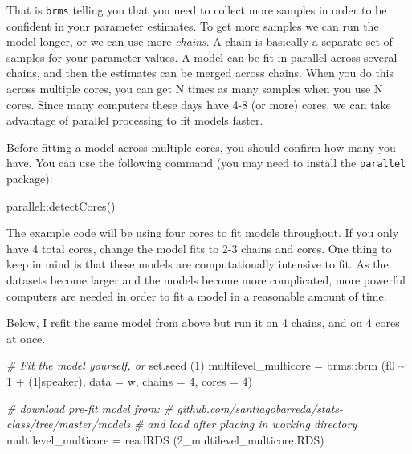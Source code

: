 \documentclass[
]{book}
\newenvironment{Shaded}{\begin{snugshade}}{\end{snugshade}}
\newcommand{\AttributeTok}[1]{\textcolor[rgb]{0.77,0.63,0.00}{#1}}
\newcommand{\CommentTok}[1]{\textcolor[rgb]{0.56,0.35,0.01}{\textit{#1}}}
\newcommand{\DecValTok}[1]{\textcolor[rgb]{0.00,0.00,0.81}{#1}}
\newcommand{\FunctionTok}[1]{\textcolor[rgb]{0.00,0.00,0.00}{#1}}
\newcommand{\NormalTok}[1]{#1}
\newcommand{\OtherTok}[1]{\textcolor[rgb]{0.56,0.35,0.01}{#1}}
\newcommand{\SpecialCharTok}[1]{\textcolor[rgb]{0.00,0.00,0.00}{#1}}
\newcommand{\StringTok}[1]{\textcolor[rgb]{0.31,0.60,0.02}{#1}}
\begin{document}
That is \texttt{brms} telling you that you need to collect more samples in order to be confident in your parameter estimates. To get more samples we can run the model longer, or we can use more \emph{chains}. A chain is basically a separate set of samples for your parameter values. A model can be fit in parallel across several chains, and then the estimates can be merged across chains. When you do this across multiple cores, you can get N times as many samples when you use N cores. Since many computers these days have 4-8 (or more) cores, we can take advantage of parallel processing to fit models faster.

Before fitting a model across multiple cores, you should confirm how many you have. You can use the following command (you may need to install the \texttt{parallel} package):

\begin{Shaded}
\begin{Highlighting}[]
\NormalTok{parallel}\SpecialCharTok{::}\FunctionTok{detectCores}\NormalTok{()}
\end{Highlighting}
\end{Shaded}

The example code will be using four cores to fit models throughout. If you only have 4 total cores, change the model fits to 2-3 chains and cores. One thing to keep in mind is that these models are computationally intensive to fit. As the datasets become larger and the models become more complicated, more powerful computers are needed in order to fit a model in a reasonable amount of time.

Below, I refit the same model from above but run it on 4 chains, and on 4 cores at once.

\begin{Shaded}
\begin{Highlighting}[]
\CommentTok{\# Fit the model yourself, or}
\FunctionTok{set.seed}\NormalTok{ (}\DecValTok{1}\NormalTok{)}
\NormalTok{multilevel\_multicore }\OtherTok{=}  
\NormalTok{  brms}\SpecialCharTok{::}\FunctionTok{brm}\NormalTok{ (f0 }\SpecialCharTok{\textasciitilde{}} \DecValTok{1} \SpecialCharTok{+}\NormalTok{ (}\DecValTok{1}\SpecialCharTok{|}\NormalTok{speaker), }\AttributeTok{data =}\NormalTok{ w, }\AttributeTok{chains =} \DecValTok{4}\NormalTok{, }\AttributeTok{cores =} \DecValTok{4}\NormalTok{)}

\CommentTok{\# download pre{-}fit model from: }
\CommentTok{\# github.com/santiagobarreda/stats{-}class/tree/master/models}
\CommentTok{\# and load after placing in working directory}
\NormalTok{multilevel\_multicore }\OtherTok{=} \FunctionTok{readRDS}\NormalTok{ (}\StringTok{\textquotesingle{}2\_multilevel\_multicore.RDS\textquotesingle{}}\NormalTok{)}
\end{Highlighting}
\end{Shaded}
\end{document}
